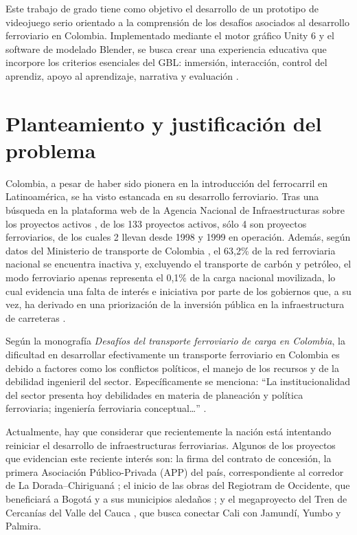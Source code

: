 Este trabajo de grado tiene como objetivo el desarrollo de un prototipo de videojuego serio orientado a la comprensión de los desafíos asociados al desarrollo ferroviario en Colombia. Implementado mediante el motor gráfico Unity 6 y el software de modelado Blender, se busca crear una experiencia educativa que incorpore los criterios esenciales del GBL: inmersión, interacción, control del aprendiz, apoyo al aprendizaje, narrativa y evaluación \autocite{gblFrameworkExamining}.

\section{Planteamiento y justificación del problema}
Colombia, a pesar de haber sido pionera en la introducción del ferrocarril en Latinoamérica, se ha visto estancada en su desarrollo ferroviario. Tras una búsqueda en la plataforma web de la Agencia Nacional de Infraestructuras sobre los proyectos activos \autocite{aniProyectos}, de los 133 proyectos activos, sólo 4 son proyectos ferroviarios, de los cuales 2 llevan desde 1998 y 1999 en operación. Además, según datos del Ministerio de transporte de Colombia \autocite{mintransporteSurcos2024}, el 63,2\% de la red ferroviaria nacional se encuentra inactiva y, excluyendo el transporte de carbón y petróleo, el modo ferroviario apenas representa el 0,1\% de la carga nacional movilizada, lo cual evidencia una falta de interés e iniciativa por parte de los gobiernos que, a su vez, ha derivado en una priorización de la inversión pública en la infraestructura de carreteras \autocite{mintransporteDatosCarga}.

Según la monografía \textit{Desafíos del transporte ferroviario de carga en Colombia}, la dificultad en desarrollar efectivamente un transporte ferroviario en Colombia es debido a factores como los conflictos políticos, el manejo de los recursos y de la debilidad ingenieril del sector. Específicamente se menciona: “La institucionalidad del sector presenta hoy debilidades en materia de planeación y política ferroviaria; ingeniería ferroviaria conceptual…” \autocite[p.~17]{iabdDesafios}.

Actualmente, hay que considerar que recientemente la nación está intentando reiniciar el desarrollo de infraestructuras ferroviarias. Algunos de los proyectos que evidencian este reciente interés son: la firma del contrato de concesión, la primera Asociación Público-Privada (APP) del país, correspondiente al corredor de La Dorada–Chiriguaná \autocite{mintransporteAPP2025}; el inicio de las obras del Regiotram de Occidente, que beneficiará a Bogotá y a sus municipios aledaños \autocite{bogotaRegiotram2025}; y el megaproyecto del Tren de Cercanías del Valle del Cauca \autocite{valoraTrenValle2024}, que busca conectar Cali con Jamundí, Yumbo y Palmira.

